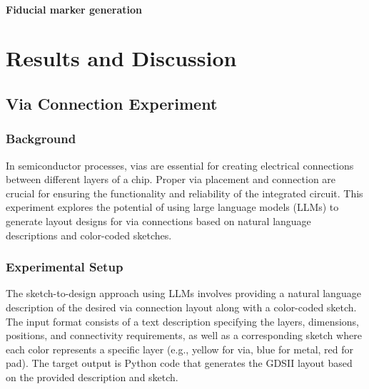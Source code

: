 \documentclass{article}
\begin{document}
\paragraph{Fiducial marker generation}

\section{Results and Discussion}
\subsection{Via Connection Experiment}
\subsubsection{Background}
In semiconductor processes, vias are essential for creating electrical connections between different layers of a chip. Proper via placement and connection are crucial for ensuring the functionality and reliability of the integrated circuit. This experiment explores the potential of using large language models (LLMs) to generate layout designs for via connections based on natural language descriptions and color-coded sketches.
\subsubsection{Experimental Setup}
The sketch-to-design approach using LLMs involves providing a natural language description of the desired via connection layout along with a color-coded sketch. The input format consists of a text description specifying the layers, dimensions, positions, and connectivity requirements, as well as a corresponding sketch where each color represents a specific layer (e.g., yellow for via, blue for metal, red for pad). The target output is Python code that generates the GDSII layout based on the provided description and sketch.
\end{document}
